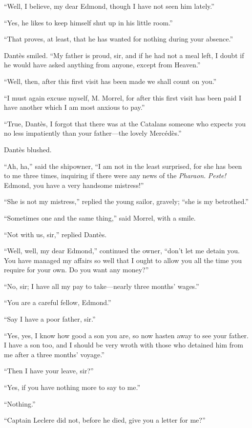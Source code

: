 “Well, I believe, my dear Edmond, though I have not seen him lately.”

“Yes, he likes to keep himself shut up in his little room.”

“That proves, at least, that he has wanted for nothing during your
absence.”

Dantès smiled. “My father is proud, sir, and if he had not a meal left,
I doubt if he would have asked anything from anyone, except from
Heaven.”

“Well, then, after this first visit has been made we shall count on
you.”

“I must again excuse myself, M. Morrel, for after this first visit has
been paid I have another which I am most anxious to pay.”

“True, Dantès, I forgot that there was at the Catalans someone who
expects you no less impatiently than your father—the lovely Mercédès.”

Dantès blushed.

“Ah, ha,” said the shipowner, “I am not in the least surprised, for she
has been to me three times, inquiring if there were any news of the
\textit{Pharaon}. \textit{Peste!} Edmond, you have a very handsome mistress!”

“She is not my mistress,” replied the young sailor, gravely; “she is my
betrothed.”

“Sometimes one and the same thing,” said Morrel, with a smile.

“Not with us, sir,” replied Dantès.

“Well, well, my dear Edmond,” continued the owner, “don’t let me detain
you. You have managed my affairs so well that I ought to allow you all
the time you require for your own. Do you want any money?”

“No, sir; I have all my pay to take—nearly three months’ wages.”

“You are a careful fellow, Edmond.”

“Say I have a poor father, sir.”

“Yes, yes, I know how good a son you are, so now hasten away to see
your father. I have a son too, and I should be very wroth with those
who detained him from me after a three months’ voyage.”

“Then I have your leave, sir?”

“Yes, if you have nothing more to say to me.”

“Nothing.”

“Captain Leclere did not, before he died, give you a letter for me?”

